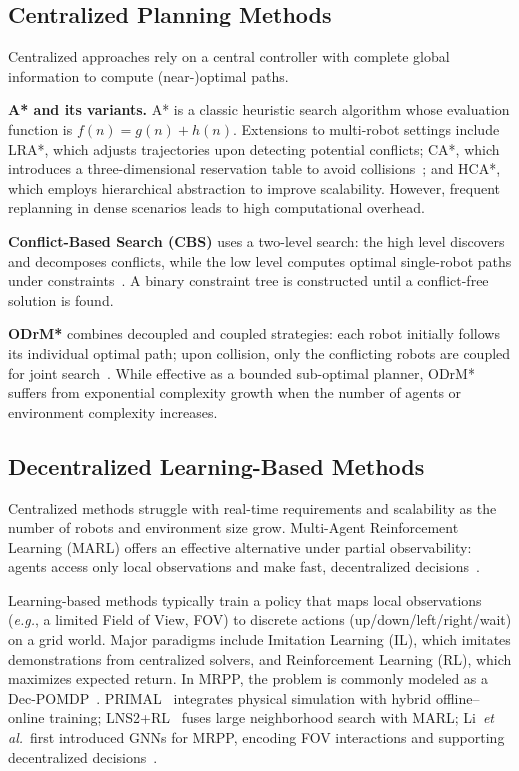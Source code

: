 \documentclass[conference]{IEEEtran}
\newcommand{\eg}{\textit{e.g.}}
\newcommand{\etal}{\textit{et al.}}
\begin{document}
\subsection{Centralized Planning Methods}

Centralized approaches rely on a central controller with
complete global information to compute (near-)optimal paths.

\textbf{A* and its variants.}
A* is a classic heuristic search algorithm whose evaluation
function is $f(n)=g(n)+h(n)$.
Extensions to multi-robot settings include LRA*, which adjusts
trajectories upon detecting potential conflicts; CA*, which
introduces a three-dimensional reservation table to avoid
collisions~\cite{silver2005cooperative}; and HCA*, which
employs hierarchical abstraction to improve scalability.
However, frequent replanning in dense scenarios leads to
high computational overhead.

\textbf{Conflict-Based Search (CBS)} uses a two-level search:
the high level discovers and decomposes conflicts, while the low
level computes optimal single-robot paths under
constraints~\cite{sharon2015cbs}.
A binary constraint tree is constructed until a conflict-free
solution is found.

\textbf{ODrM*} combines decoupled and coupled strategies: each
robot initially follows its individual optimal path; upon
collision, only the conflicting robots are coupled for joint
search~\cite{ren2021subdimensional,ellis2021mapf}.
While effective as a bounded sub-optimal planner, ODrM* suffers
from exponential complexity growth when the number of agents or
environment complexity increases.

\subsection{Decentralized Learning-Based Methods}

Centralized methods struggle with real-time requirements and
scalability as the number of robots and environment size grow.
Multi-Agent Reinforcement Learning (MARL) offers an effective
alternative under partial observability: agents access only
local observations and make fast, decentralized
decisions~\cite{huang2021strategic}.

Learning-based methods typically train a policy that maps local
observations (\eg, a limited Field of View, FOV) to discrete
actions (up/down/left/right/wait) on a grid world.
Major paradigms include Imitation Learning (IL), which imitates
demonstrations from centralized solvers, and Reinforcement
Learning (RL), which maximizes expected return.
In MRPP, the problem is commonly modeled as a
Dec-POMDP~\cite{huang2021strategic}.
PRIMAL~\cite{sartoretti2019primal} integrates physical simulation
with hybrid offline--online training;
LNS2+RL~\cite{wang2025lns2rl} fuses large neighborhood search
with MARL;
Li~\etal~first introduced GNNs for MRPP, encoding FOV
interactions and supporting decentralized
decisions~\cite{li2020gnn,li2021magat}.
\end{document}
